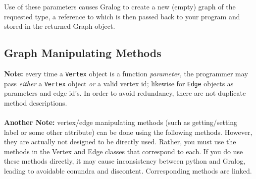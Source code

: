 \documentclass{article}
\newlength\q
\begin{document}
Use of these parameters causes Gralog to create a new (empty) graph of the requested type, a reference to which is then passed back to your program and stored in the returned Graph object.
\subsection{Graph Manipulating Methods}
\textbf{Note:} every time a \texttt{Vertex} object is a function \textit{parameter}, the programmer may pass \textit{either} a \texttt{Vertex} object \textit{or} a valid vertex id; likewise for \texttt{Edge} objects as parameters and edge id's. In order to avoid redundancy, there are not duplicate method descriptions.\\\\
\textbf{Another Note:} vertex/edge manipulating methods (such as getting/setting label or some other attribute) can be done using the following methods. However, they are actually not designed to be directly used. Rather, you must use the methods in the Vertex and Edge classes that correspond to each. If you do use these methods directly, it may cause inconsistency between python and Gralog, leading to avoidable conundra and discontent. Corresponding methods are linked.
\end{document}
